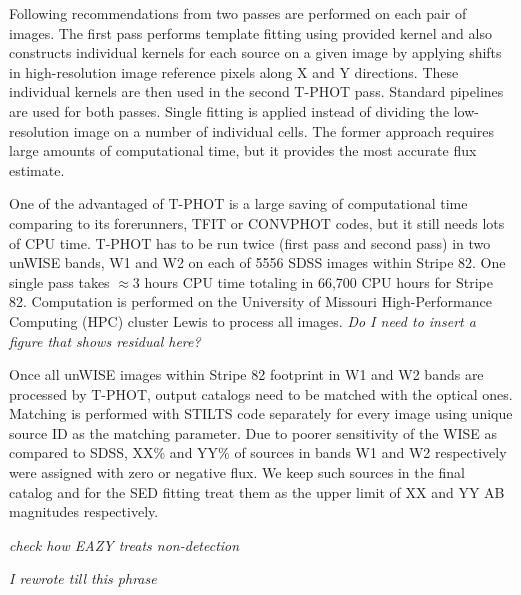 \documentclass[apj,iop]{emulateapj}
\begin{document}
Following recommendations from \citet{Merlin2016a} two passes are performed on each pair of images. The first pass performs template fitting using provided kernel and also constructs individual kernels for each source on a given image by applying shifts in high-resolution image reference pixels along X and Y directions. These individual kernels are then used in the second T-PHOT pass. Standard pipelines are used for both passes. Single fitting is applied instead of dividing the low-resolution image on a number of individual cells. The former approach requires large amounts of computational time, but it provides the most accurate flux estimate.

One of the advantaged of T-PHOT is a large saving of computational time comparing to its forerunners, TFIT or CONVPHOT codes, but it still needs lots of CPU time. T-PHOT has to be run twice (first pass and second pass) in two unWISE bands, W1 and W2 on each of 5556 SDSS images within Stripe 82. One single pass takes $\approx3$ hours CPU time totaling in 66,700 CPU hours for Stripe 82. Computation is performed on the University of Missouri High-Performance Computing (HPC) cluster Lewis to process all images. 
\textit{Do I need to insert a figure that shows residual here?}

Once all unWISE images within Stripe 82 footprint in W1 and W2 bands are processed by T-PHOT, output catalogs need to be matched with the optical ones. Matching is performed with STILTS code separately for every image using unique source ID as the matching parameter. Due to poorer sensitivity of the WISE as compared to SDSS, XX\% and YY\% of sources in bands W1 and W2 respectively were assigned with zero or negative flux. We keep such sources in the final catalog and for the SED fitting treat them as the upper limit of XX and YY AB magnitudes respectively.

\textit{check how EAZY treats non-detection}

\textit{I rewrote till this phrase}

\end{document}
